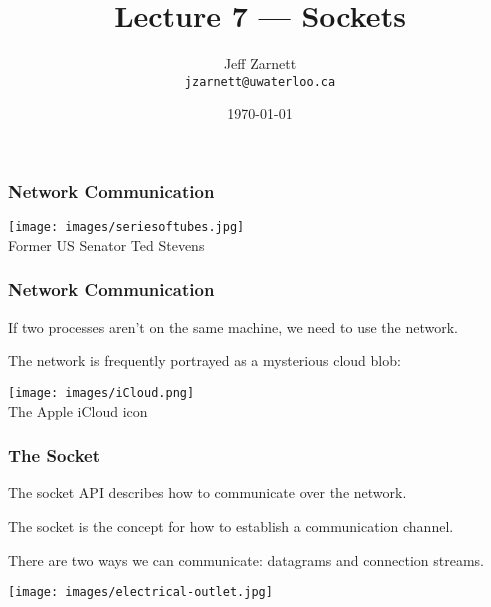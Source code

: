 

\title{Lecture 7 --- Sockets }

\author{Jeff Zarnett \\ \small \texttt{jzarnett@uwaterloo.ca}}
\date{\today}




\begin{frame}
	\titlepage

\end{frame}


\begin{frame}
	\frametitle{Network Communication}

	\begin{center}
		\texttt{[image: images/seriesoftubes.jpg]}\\
		Former US Senator Ted Stevens
	\end{center}


\end{frame}


\begin{frame}
	\frametitle{Network Communication}

	If two processes aren't on the same machine, we need to use the network.

	The network is frequently portrayed as a mysterious cloud blob:

	\begin{center}
		\texttt{[image: images/iCloud.png]}\\
		The Apple iCloud icon
	\end{center}

\end{frame}


\begin{frame}
	\frametitle{The Socket}

	The \alert{socket} API describes how to communicate over the network.

	The socket is the concept for how to establish a communication channel.

	There are two ways we can communicate: datagrams and connection streams.

	\begin{center}
		\texttt{[image: images/electrical-outlet.jpg]}
	\end{center}

\end{frame}


